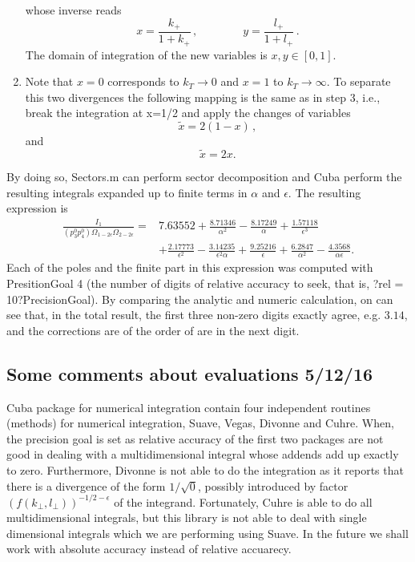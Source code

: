 \documentclass[a4paper,11pt]{article}
\numberwithin{equation}{section}
\newcommand{\kp}{k_+}
\newcommand{\lp}{l_+}
\begin{document}
\begin{enumerate}
%
whose inverse reads
\begin{equation}
  x = \frac{\kp}{1+\kp}\,, 
  \qquad \qquad
  y = \frac{\lp}{1+\lp}\,.
\end{equation}
The domain of integration of the new variables is $x,y\in [0,1] $. 
\item Note that $x=0$ corresponds to $k_T\to0$ and $x=1$ to $k_T\to\infty$. To separate this two divergences the following mapping is the same as in step 3, i.e., break the integration at x=1/2 and apply the changes of variables 
\begin{equation}
  \tilde x = 2(1- x)\,,
\end{equation}
%
and
%
\begin{equation}
  \tilde x = 2  x.
\end{equation}
\end{enumerate}
By doing so, Sectors.m can perform sector decomposition and Cuba perform the resulting integrals 
expanded up to finite terms in $\alpha$ and $\epsilon$. The resulting expression is
\begin{align}
\frac {I_1}{ (p_3^0 p_4^0)  \Omega_{1-2\epsilon} \Omega_{2-2\epsilon} }= &
7.63552 + \frac{8.71346}{\alpha^2} - \frac{8.17249}{\alpha} + \frac{1.57118}{\epsilon^3} \\
&+ \frac{2.17773}{\epsilon^2} - \frac{3.14235}{\epsilon^2 \alpha} + \frac{9.25216}{\epsilon} 
+ \frac{6.2847}{\alpha^2} - \frac{4.3568}{\alpha\epsilon}.
\nonumber
\end{align}
Each of the poles and the finite part in this expression was computed with PresitionGoal 4 (the number of digits of relative accuracy to seek, that is, ?rel = 10?PrecisionGoal). By comparing the analytic and numeric calculation, on can see that, in the total result, the first three non-zero digits exactly agree, e.g. $3.14$,  and the corrections are of the order of are in the next digit.



\subsection{Some comments about evaluations 5/12/16}

Cuba package for numerical integration contain four independent  
routines (methods) for numerical integration, Suave, Vegas, Divonne and 
Cuhre. When, the precision goal is set as relative accuracy of the first two 
packages are not good in dealing with a multidimensional integral whose 
addends add up exactly to zero. Furthermore, Divonne is not able to do the 
integration as it reports that there is a divergence of the form $1/\sqrt{0}$, 
possibly introduced by factor $\left( f(k_\perp, l_\perp)\right)^{-1/2-\epsilon}$ 
of the integrand. Fortunately, Cuhre is able to do all multidimensional integrals, 
but this library is not able to deal with single dimensional integrals which we 
are performing using Suave. In the future we shall work with absolute 
accuracy instead of relative accuarecy. 
\end{document}

